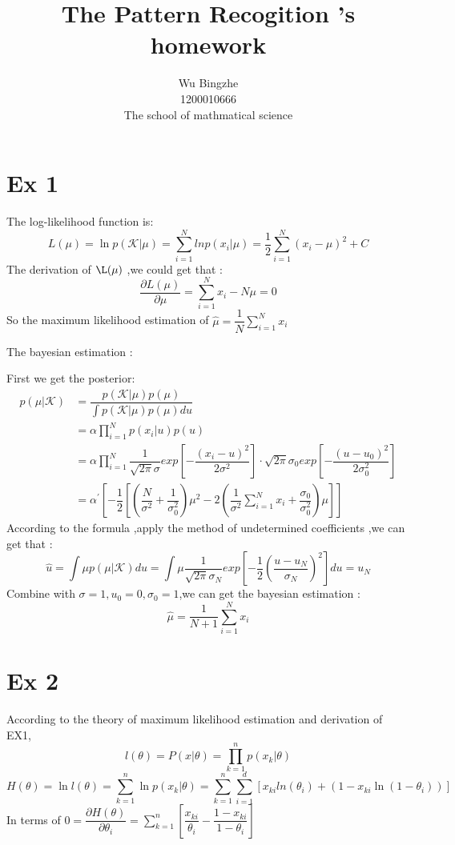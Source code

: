 \documentclass[10pt,a4paper]{article}
\author{Wu Bingzhe\\1200010666\\The school of mathmatical science}
\title{The Pattern Recogition 's homework}
\begin{document}
	\maketitle
	\section{Ex 1}
	
	The log-likelihood function is:
	\begin{equation}
	L(\mu)=\ln p(\mathscr{K}|\mu)=\sum_{i=1}^{N}lnp(x_i|\mu)=\dfrac{1}{2}\sum_{i=1}^{N}(x_i-\mu)^2+C
	\end{equation}
	The derivation of $\L(\mu)$ ,we could get that :
	\begin{equation*}
	\dfrac{\partial L(\mu )}{\partial \mu}=\sum_{i=1}^{N}x_i-N\mu =0
	\end{equation*}
	So the maximum likelihood estimation of $\hat{\mu}=\dfrac{1}{N}\sum_{i=1}^{N}x_i$
	
	The bayesian estimation :
	
	First we get the posterior:
	\begin{equation*}
	\begin{split}
	p(\mu|\mathscr{K})&=\dfrac{p(\mathscr{K}|\mu )p(\mu)}{\int p(\mathscr{K}|\mu )p(\mu)du}\\
	&=\alpha \prod_{i=1}^{N}p(x_i|u)p(u)\\
	&=\alpha\prod_{i=1}^{N}\dfrac{1}{\sqrt{2\pi}\sigma}exp[-\dfrac{(x_i-u)^2}{2\sigma^2}]\cdot\sqrt{2\pi}\sigma_0 exp[-\dfrac{(u-u_0)^2}{2\sigma_0^2}] \\
	&=\alpha^{'}[-\dfrac{1}{2}[(\dfrac{N}{\sigma^2}+\dfrac{1}{\sigma_0^2})\mu^2-2(\dfrac{1}{\sigma^2}\sum_{i=1}^{N}x_i+\dfrac{\sigma_0}{\sigma_0^2})\mu ]]
	\end{split}
	\end{equation*}
	According to the formula ,apply the method of undetermined coefficients ,we can get that :
	\begin{equation*}
	\hat{u} =\int\mu p(\mu|\mathscr{K})du=\int\mu\dfrac{1}{\sqrt{2\pi}\sigma_N}exp[-\dfrac{1}{2}(\dfrac{u-u_N}{\sigma_N})^2]du=u_N
	\end{equation*}
	Combine with $\sigma=1,u_0=0,\sigma_0=1$,we can get the bayesian estimation :
	\begin{equation*}
	\hat{\mu}=\dfrac{1}{N+1}\sum_{i=1}^{N}x_i
	\end{equation*}
	\section{Ex 2}
	According to the theory of maximum likelihood estimation and derivation of EX1,
	\begin{equation*}
	l(\theta)=P(x|\theta)=\prod_{k=1}^{n}p(x_k|\theta)
	\end{equation*}
	\begin{equation*}
	H(\theta)=\ln l(\theta)=\sum_{k=1}^{n}\ln p(x_k|\theta)=\sum_{k=1}^{n}\sum_{i=1}^{d}[x_{ki}ln(\theta_i)+(1-x_{ki}\ln(1-\theta_i))]
	\end{equation*}
	In terms of $0=\dfrac{\partial H(\theta)}{\partial \theta_i}=\sum_{k=1}^{n}[\dfrac{x_{ki}}{\theta_i}-\dfrac{1-x_{ki}}{1-\theta_i}]$
	
\end{document}
